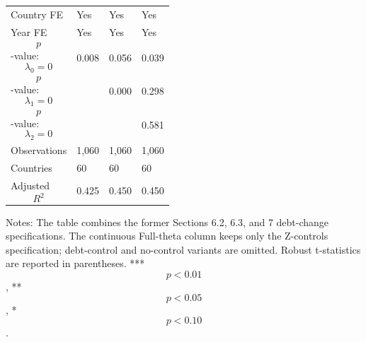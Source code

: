 \begin{table}[H]
\begin{threeparttable}
\begin{tabularx}{\textwidth}{lYYY}
Country FE & Yes & Yes & Yes \\
Year FE & Yes & Yes & Yes \\
$$p$$-value: $$\lambda_0=0$$ & 0.008 & 0.056 & 0.039 \\
$$p$$-value: $$\lambda_1=0$$ &  & 0.000 & 0.298 \\
$$p$$-value: $$\lambda_2=0$$ &  &  & 0.581 \\
Observations & 1,060 & 1,060 & 1,060 \\
Countries & 60 & 60 & 60 \\
Adjusted $$R^2$$ & 0.425 & 0.450 & 0.450 \\
\bottomrule
\end{tabularx}
\begin{tablenotes}[flushleft]\footnotesize
\item Notes: The table combines the former Sections 6.2, 6.3, and 7 debt-change specifications. The continuous Full-theta column keeps only the Z-controls specification; debt-control and no-control variants are omitted. Robust t-statistics are reported in parentheses. *** $$p<0.01$$, ** $$p<0.05$$, * $$p<0.10$$.
\end{tablenotes}
\end{threeparttable}
\end{table}

